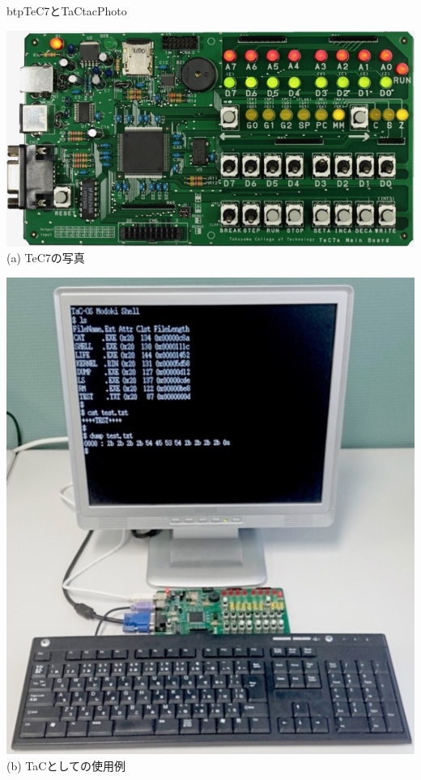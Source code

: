 \begin{myfig}{btp}{TeC7とTaC}{tacPhoto}
\begin{minipage}{0.58\columnwidth}
\begin{center}
\includegraphics[scale=0.35]{Photo/TeC7.jpg}\\
(a) TeC7の写真
\end{center}
\end{minipage}
\begin{minipage}{0.38\columnwidth}
\begin{center}
\includegraphics[scale=0.3]{Photo/TaC.jpg}\\
(b) TaCとしての使用例
\end{center}
\end{minipage}
\end{myfig}

